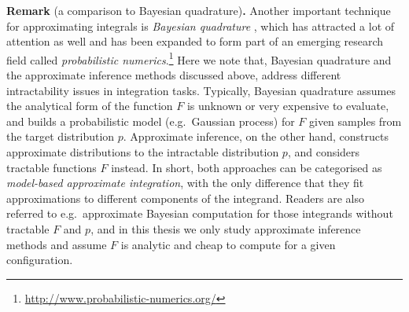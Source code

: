 \vspace{1em}
\begin{tcolorbox}
\textbf{Remark} (a comparison to Bayesian quadrature)\textbf{.}
Another important technique for approximating integrals is \emph{Bayesian quadrature} \citep{ohagan:bayesian_quadrature1991, kennedy:bq1996, ghahramani:bayesianMC2003}, which has attracted a lot of attention as well and has been expanded to form part of an emerging research field called \emph{probabilistic numerics}.\footnote{\url{http://www.probabilistic-numerics.org/}} Here we note that, Bayesian quadrature and the approximate inference methods discussed above, address different intractability issues in integration tasks. Typically, Bayesian quadrature assumes the analytical form of the function $F$ is unknown or very expensive to evaluate, and builds a probabilistic model (e.g.~Gaussian process) for $F$ given samples from the target distribution $p$. Approximate inference, on the other hand, constructs approximate distributions to the intractable distribution $p$, and considers tractable functions $F$ instead. In short, both approaches can be categorised as \emph{model-based approximate integration}, with the only difference that they fit approximations to different components of the integrand. Readers are also referred to e.g.~approximate Bayesian computation \citep{beaumont:abc2002} for those integrands without tractable $F$ and $p$, and in this thesis we only study approximate inference methods and assume $F$ is analytic and cheap to compute for a given configuration.
\end{tcolorbox}
